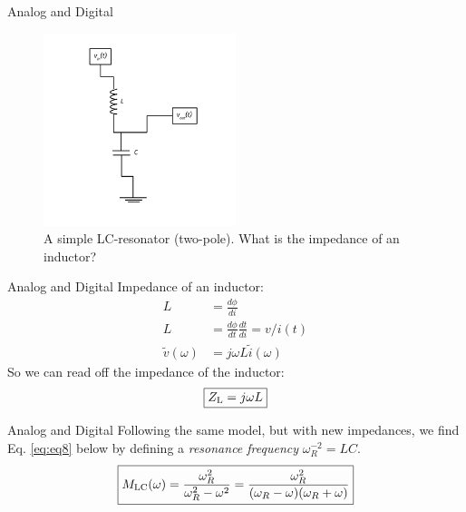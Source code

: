 \documentclass{beamer}
\begin{document}
\begin{frame}{Analog and Digital}
\begin{figure}
\centering
\includegraphics[width=0.5\textwidth]{AnalogExample/LowPassLC.pdf}
\caption{\label{fig:example4} A simple LC-resonator (two-pole).  What is the impedance of an inductor?}
\end{figure}
\end{frame}

\begin{frame}{Analog and Digital}
Impedance of an inductor:
\begin{align}
L &= \frac{d\phi}{di} \\
L &= \frac{d\phi}{dt}\frac{dt}{di} = v/i(t) \\
\tilde{v}(\omega) &= j\omega L\tilde{i}(\omega)
\end{align}
So we can read off the impedance of the inductor:
\begin{equation}
\boxed{
Z_{\rm L} = j\omega L}
\end{equation}
\end{frame}

\begin{frame}{Analog and Digital}
Following the same model, but with new impedances, we find Eq. \ref{eq:eq8} below by defining a \textit{resonance frequency} $\omega_R^{-2} = LC$. 
\begin{equation}
\boxed{
M_{\rm LC}(\omega) = \frac{\omega_R^2}{\omega_R^2-\omega^2} = \frac{\omega_R^2}{(\omega_R-\omega)(\omega_R + \omega)}
}
\label{eq:eq10}
\end{equation}
\end{frame}
\end{document}
